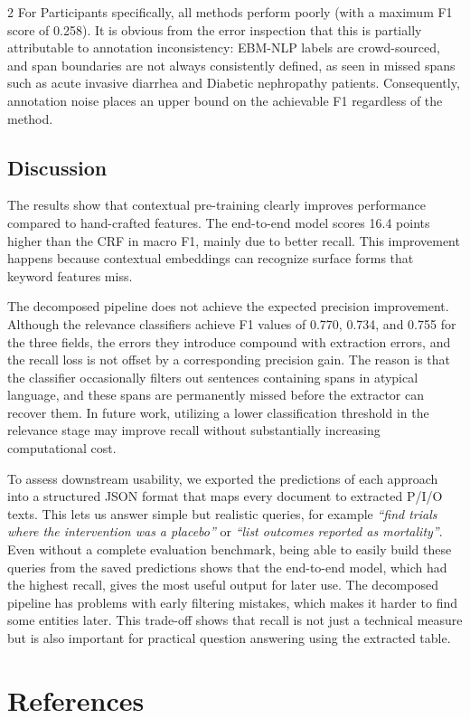 \documentclass[11pt]{article}
\begin{document}
\begin{multicols}{2}
For Participants specifically, all methods perform poorly (with a maximum F1 score of 0.258). It is obvious from the error inspection that this is partially attributable to annotation inconsistency: EBM-NLP labels are crowd-sourced, and span boundaries are not always consistently defined, as seen in missed spans such as acute invasive diarrhea and Diabetic nephropathy patients. Consequently, annotation noise places an upper bound on the achievable F1 regardless of the method.

\subsection{Discussion}
The results show that contextual pre-training clearly improves performance compared to hand-crafted features. The end-to-end model scores 16.4 points higher than the CRF in macro F1, mainly due to better recall. This improvement happens because contextual embeddings can recognize surface forms that keyword features miss.

The decomposed pipeline does not achieve the expected precision improvement.
Although the relevance classifiers achieve F1 values of 0.770, 0.734, and 0.755 for the three fields, the errors they introduce compound with extraction errors, and the recall loss is not offset by a corresponding precision gain.
The reason is that the classifier occasionally filters out sentences containing spans in atypical language, and these spans are permanently missed before the extractor can recover them.
In future work, utilizing a lower classification threshold in the relevance stage may improve recall without substantially increasing computational cost.

To assess downstream usability, we exported the predictions of each approach into a structured JSON format that maps every document to extracted P/I/O texts. This lets us answer simple but realistic queries, for example \emph{“find trials where the intervention was a placebo”} or \emph{“list outcomes reported as mortality”}. Even without a complete evaluation benchmark, being able to easily build these queries from the saved predictions shows that the end-to-end model, which had the highest recall, gives the most useful output for later use. The decomposed pipeline has problems with early filtering mistakes, which makes it harder to find some entities later. This trade-off shows that recall is not just a technical measure but is also important for practical question answering using the extracted table.
\section*{References}



\end{multicols}
\end{document}
